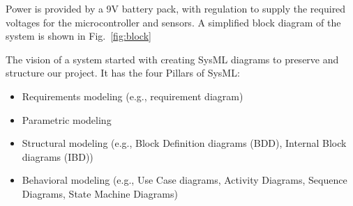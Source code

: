 \documentclass[conference]{IEEEtran}
\begin{document}
Power is provided by a 9V battery pack, with regulation to supply the required voltages for the microcontroller and sensors. A simplified block diagram of the system is shown in Fig.~\ref{fig:block}

The vision of a system started with creating SysML diagrams to preserve and structure our project. It has the four Pillars of SysML:
\vspace{1em}
\begin{itemize}
  \item Requirements modeling (e.g., requirement diagram)
  \item Parametric modeling
  \item Structural modeling (e.g., Block Definition diagrams (BDD), Internal Block diagrams (IBD))
  \item Behavioral modeling (e.g., Use Case diagrams, Activity Diagrams, Sequence Diagrams, State Machine Diagrams)
\end{itemize}
\vspace{1em}
\end{document}
